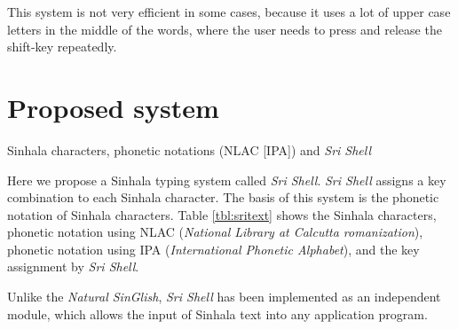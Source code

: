 \documentclass[english]{jnlp_1.3e}
\begin{document}
This system is not very efficient in some cases, because it uses a lot of upper case letters in the middle of the words, where the user needs to press and release the shift-key repeatedly.  





\section{Proposed system}
\label{srishell}

\begin{table}[t]
\caption{Sinhala characters, phonetic notations (NLAC [IPA]) and {\it Sri Shell}}
\label{tbl:sritext}

\end{table}

Here we propose a Sinhala typing system called {\it Sri Shell}. 
{\it Sri Shell} assigns a key combination to each Sinhala character. 
The basis of this system is the phonetic notation of Sinhala characters. 
Table \ref{tbl:sritext} shows the Sinhala characters, phonetic notation using NLAC ({\it National Library at Calcutta romanization}), 
phonetic notation using IPA ({\it International Phonetic Alphabet}), and the key assignment by {\it Sri Shell}.

Unlike the {\it Natural SinGlish}, {\it Sri Shell} has been implemented as an independent module, which allows the input of Sinhala text into any application program.
\end{document}
